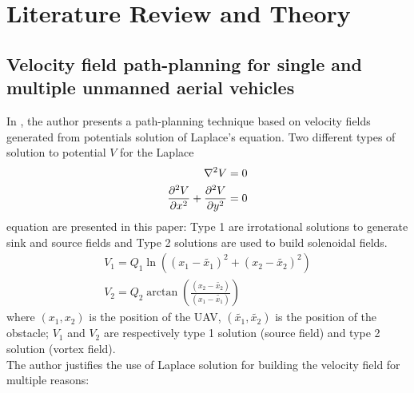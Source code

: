 \section{Literature Review and Theory}
\subsection{Velocity field path-planning for single and multiple unmanned aerial vehicles \cite{li1999passive}}
In \cite{farinha2020unmanned}, the author presents a path-planning technique based on velocity fields generated from potentials solution of Laplace's equation.
Two different types of solution to potential $V$ for the Laplace 
\begin{align} %
    \laplacian{V} &=0 \nonumber \\
    \frac{\partial^2 V}{\partial x^2}+\dpd[2]{V}{y} &=0 \label{eq:Laplace} %
\end{align}
equation are presented in this paper: Type 1 are irrotational solutions to generate sink and source fields and Type 2 solutions are used to build solenoidal fields.
\begin{align} %
    {V}_{1} = {Q}_{1} \ln(({x}_{1}-\tilde{{x}_{1}})^2+({x}_{2}-\tilde{{x}_{2}})^2) \\
    {V}_{2} = {Q}_{2} \arctan(\frac{({x}_{2}-\tilde{{x}_{2}})}{({x}_{1}-\tilde{{x}_{1}})})
\end{align}
where $({x}_{1},{x}_{2})$ is the position of the UAV, $(\tilde{{x}_{1}}, \tilde{{x}_{2}})$ is the position of the obstacle;
${V}_{1}$ and ${V}_{2}$ are respectively type 1 solution (source field) and type 2 solution (vortex field). \\
The author justifies the use of Laplace solution for building the velocity field for multiple reasons:
